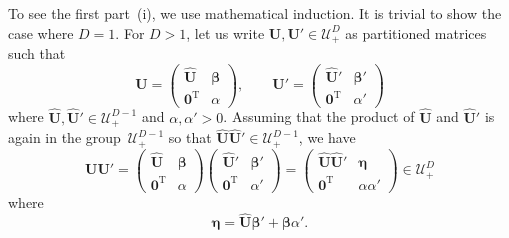 \documentclass[12pt,a4paper]{article}
\begin{document}
To see the first part~(i), we use mathematical induction.
It is trivial to show the case where $D = 1$.
For $D > 1$, let us write $\mathbf{U}, \mathbf{U}' \in \mathcal{U}_{+}^{D}$
as partitioned matrices such that
\begin{equation}
\mathbf{U} =
\begin{pmatrix}
\widehat{\mathbf{U}} & \bm{\beta} \\
\mathbf{0}^{\operatorname{T}} & \alpha
\end{pmatrix}, \qquad
\mathbf{U}' =
\begin{pmatrix}
\widehat{\mathbf{U}}' & \bm{\beta}' \\
\mathbf{0}^{\operatorname{T}} & \alpha'
\end{pmatrix}
\label{eq:partitioned_matrices_for_proof_of_triangular_matrix_group}
\end{equation}
where $\widehat{\mathbf{U}}, \widehat{\mathbf{U}}' \in \mathcal{U}_{+}^{D - 1}$ and
$\alpha, \alpha' > 0$.
Assuming that the product of $\widehat{\mathbf{U}}$ and $\widehat{\mathbf{U}}'$ is again
in the group~$\mathcal{U}_{+}^{D - 1}$ so that
$\widehat{\mathbf{U}}\widehat{\mathbf{U}}' \in \mathcal{U}_{+}^{D - 1}$,
we have
\begin{equation}
\mathbf{U}\mathbf{U}' =
\begin{pmatrix}
\widehat{\mathbf{U}} & \bm{\beta} \\
\mathbf{0}^{\operatorname{T}} & \alpha
\end{pmatrix}
\begin{pmatrix}
\widehat{\mathbf{U}}' & \bm{\beta}' \\
\mathbf{0}^{\operatorname{T}} & \alpha'
\end{pmatrix}
=
\begin{pmatrix}
\widehat{\mathbf{U}}\widehat{\mathbf{U}}' & \bm{\eta} \\
\mathbf{0}^{\operatorname{T}} & \alpha\alpha'
\end{pmatrix} \in \mathcal{U}_{+}^{D}
\end{equation}
where
\begin{equation}
\bm{\eta} = \widehat{\mathbf{U}}\bm{\beta}' + \bm{\beta}\alpha' .
\end{equation}
\end{document}
